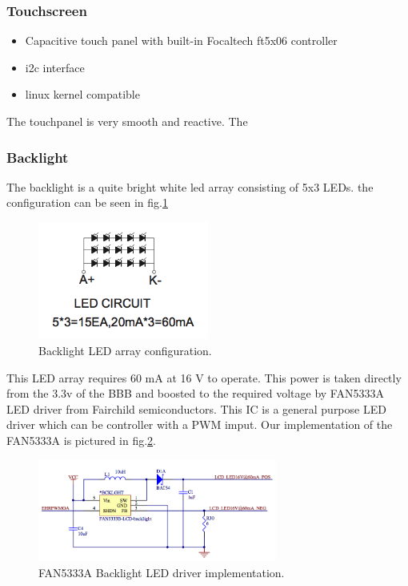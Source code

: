 \subsubsection{Touchscreen}

\begin{itemize}
  \item {Capacitive touch panel with built-in Focaltech ft5x06 controller}
  \item {i2c interface}
  \item {linux kernel compatible}
\end{itemize}
The touchpanel is very smooth and reactive. The
\subsubsection{Backlight}
The backlight is a quite bright white led array consisting of 5x3 LEDs. the configuration can be seen in fig.\ref{fig:backlight_led}

\begin{figure}[!htb]
    \centering
    \includegraphics[width=0.5\textwidth,keepaspectratio]{chap/hardFig/backlight_led_circuit}
    \caption{Backlight LED array configuration.}
    \label{fig:backlight_led}
\end{figure}

This LED array requires 60 mA at 16 V to operate. This power is taken directly from the 3.3v of the BBB and boosted to the required voltage by FAN5333A LED driver from Fairchild semiconductors.
This IC is a general purpose LED driver which can be controller with a PWM imput.
Our implementation of the FAN5333A is pictured in fig.\ref{fig:backlight driver schematics}.

\begin{figure}[!htb]
    \centering
    \includegraphics[width=0.7\textwidth,keepaspectratio]{chap/hardFig/backlight_led_driver_sch}
    \caption{FAN5333A Backlight LED driver implementation.}
    \label{fig:backlight driver schematics}
\end{figure}

